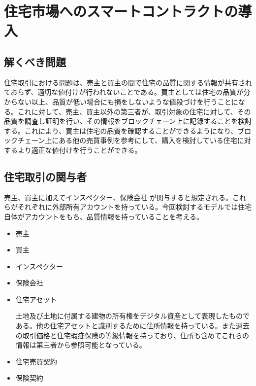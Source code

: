 \documentclass[a4paper,10.5pt]{jlreq}
\begin{document}
\section{住宅市場へのスマートコントラクトの導入}
\subsection{解くべき問題}
住宅取引における問題は、売主と買主の間で住宅の品質に関する情報が共有されておらず、適切な値付けが行われないことである。買主としては住宅の品質が分からない以上、品質が低い場合にも損をしないような値段づけを行うことになる。これに対して、売主、買主以外の第三者が、取引対象の住宅に対して、その品質を調査し証明を行い、その情報をブロックチェーン上に記録することを検討する。これにより、買主は住宅の品質を確認することができるようになり、ブロックチェーン上にある他の売買事例を参考にして、購入を検討している住宅に対するより適正な値付けを行うことができる。

\subsection{住宅取引の関与者}
売主、買主に加えてインスペクター、保険会社%
が関与すると想定される。これらがそれぞれに外部所有アカウントを持っている。今回検討するモデルでは住宅自体がアカウントをもち、品質情報を持っていることを考える。
\begin{itemize}
	\item 売主
    \item 買主
    \item インスペクター
    \item 保険会社
	\item 住宅アセット	
	\par 土地及び土地に付属する建物の所有権をデジタル資産として表現したものである。他の住宅アセットと識別するために住所情報を持っている。また過去の取引価格と住宅瑕疵保険の等級情報を持っており、住所も含めてこれらの情報は第三者から参照可能となっている。
	\item 住宅売買契約
	\item 保険契約

\end{itemize}
\end{document}
